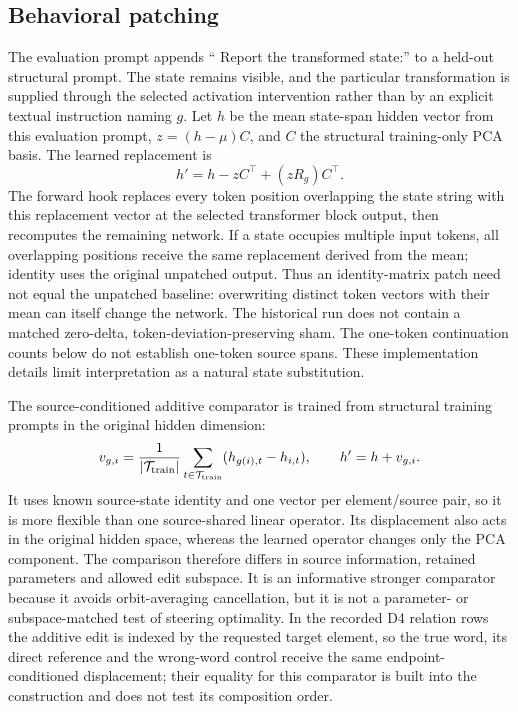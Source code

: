 \subsection{Behavioral patching}
\label{app:behavior}
The evaluation prompt appends `` Report the transformed state:'' to a held-out structural prompt. The state remains visible, and the particular transformation is supplied through the selected activation intervention rather than by an explicit textual instruction naming $g$. Let $h$ be the mean state-span hidden vector from this evaluation prompt, $z=(h-\mu)C$, and $C$ the structural training-only PCA basis. The learned replacement is
\[
 h'=h-zC^\top+(zR_g)C^\top.
\]
The forward hook replaces every token position overlapping the state string with this replacement vector at the selected transformer block output, then recomputes the remaining network. If a state occupies multiple input tokens, all overlapping positions receive the same replacement derived from the mean; identity uses the original unpatched output. Thus an identity-matrix patch need not equal the unpatched baseline: overwriting distinct token vectors with their mean can itself change the network. The historical run does not contain a matched zero-delta, token-deviation-preserving sham. The one-token continuation counts below do not establish one-token source spans. These implementation details limit interpretation as a natural state substitution.

The source-conditioned additive comparator is trained from structural training prompts in the original hidden dimension:
\[
 v_{g,i}=\frac1{|\mathcal T_{\rm train}|}\sum_{t\in\mathcal T_{\rm train}}
 (h_{g(i),t}-h_{i,t}),\qquad h'=h+v_{g,i}.
\]
It uses known source-state identity and one vector per element/source pair, so it is more flexible than one source-shared linear operator. Its displacement also acts in the original hidden space, whereas the learned operator changes only the PCA component. The comparison therefore differs in source information, retained parameters and allowed edit subspace. It is an informative stronger comparator because it avoids orbit-averaging cancellation, but it is not a parameter- or subspace-matched test of steering optimality. In the recorded D4 relation rows the additive edit is indexed by the requested target element, so the true word, its direct reference and the wrong-word control receive the same endpoint-conditioned displacement; their equality for this comparator is built into the construction and does not test its composition order.

